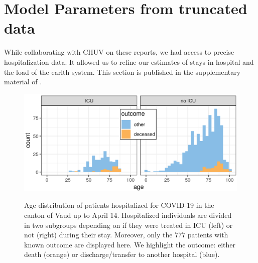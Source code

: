 \section{Model Parameters from truncated data}
While collaborating with CHUV on these reports, we had access to precise hospitalization data. It allowed us to refine our estimates\cite{Rees:COVID19LengthHospital:2020} of stays in hospital and the load of the earlth system. This section is published in the supplementary material of
.
\begin{figure}[!htb]%
    \centering
        \caption[Age distribution of patients hospitalized for COVID-19 in the canton of Vaud]{Age distribution of patients hospitalized for COVID-19 in the canton of Vaud up to April 14. Hospitalized individuals are divided in two subgroups depending on if they were treated in ICU (left) or not (right) during their stay. Moreover, only the 777 patients with known outcome are displayed here. We highlight the outcome:  either death (orange) or discharge/transfer to another hospital (blue).}
    \includegraphics{fig_covid-switzerland-npi/fig_supp/VD_hist_age_mod.png}
    \label{fig:vdage}
\end{figure}
